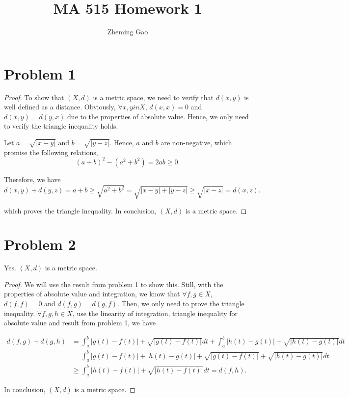\documentclass[12pt]{article}
\begin{document}
 
 
\title{MA 515 Homework 1}
\author{Zheming Gao}
\maketitle

\section*{Problem 1}

\begin{proof}

To show that $(X, d)$ is a metric space, we need to verify that $d(x, y)$ is well defined as a distance. Obviously, $\forall x, y in X$, $d(x, x) = 0$ and $d(x, y) = d(y, x)$ due to the properties of absolute value. Hence, we only need to verify the triangle inequality holds.

Let $a = \sqrt{|x - y|}$ and $b = \sqrt{|y - z|}$. Hence, 
$a$ and $b$ are non-negative, which promise the following relations,
$$
(a + b)^2 - (a^2 + b^2) = 2ab \geqslant 0.
$$

Therefore, we have
$$
d(x, y) + d(y, z) = a + b \geqslant \sqrt{a^2 + b^2} = \sqrt{|x - y|+|y - z|} \geqslant \sqrt{|x - z|} = d(x, z).
$$

which proves the triangle inequality. In conclusion, $(X, d)$ is a metric space.

\end{proof}


\section*{Problem 2}

Yes. $(X, d)$ is a metric space.

\begin{proof}

We will use the result from problem 1 to show this. Still, with the properties of absolute value and integration, we know that $\forall f, g \in X$, $d(f, f) = 0$ and $d(f, g) = d(g, f)$. Then, we only need to prove the triangle inequality. $\forall f, g, h \in X$, use the linearity of integration, triangle inequality for absolute value and result from problem 1, we have

$$
\begin{aligned}
d(f, g) + d(g, h) & = \int_a^b |g(t) - f(t)| + \sqrt{|g(t) - f(t)|} dt + \int_a^b |h(t) - g(t)| + \sqrt{|h(t) - g(t)|} dt \\
& =  \int_a^b |g(t) - f(t)| + |h(t) - g(t)| + \sqrt{|g(t) - f(t)|} + \sqrt{|h(t) - g(t)|} dt \\
& \geqslant \int_a^b |h(t) - f(t)| + \sqrt{|h(t) - f(t)|} dt = d(f, h).
\end{aligned}
$$

In conclusion, $(X, d)$ is a metric space.

\end{proof}
\end{document}
